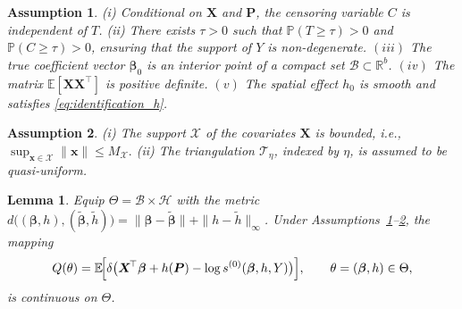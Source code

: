 \documentclass[10pt,a4paper]{amsart}
\newtheorem{assumption}{Assumption}
\newtheorem{lemma}{Lemma}
\begin{document}
\begin{assumption}\label{assumption:identifiability}
	(i) Conditional on $\bm{X}$ and $\bm{P}$, the censoring variable $C$ is independent of $T$.
	(ii) There exists $\tau > 0$ such that $\mathbb{P}(T \ge \tau) > 0$ and $\mathbb{P}(C \ge \tau) > 0$, ensuring that the support of $Y$ is non-degenerate. $(iii)$ The true coefficient vector \(\bm\beta_0\) is an interior point of a compact set \(\mathcal B \subset \mathbb{R}^b\). $(iv)$ The matrix \(\mathbb E[\bm X\bm X^\top]\) is positive definite. $(v)$ The spatial effect $h_0$ is smooth and satisfies \eqref{eq:identification_h}. %
\end{assumption}

\begin{assumption}\label{assumption:density_P}
	(i) The support $\mathcal{X}$ of the covariates $\bm X$ is bounded, i.e.,
	\(
	\sup_{\bm x\in \mathcal{X}} \|\bm x\|\le M_{\mathcal{X}}.
	\) (ii) The triangulation $\mathcal{T}_\eta$, indexed by $\eta$, is assumed to be quasi-uniform.
\end{assumption}

	\begin{lemma}\label{lem:Q_continuous}
		Equip $\Theta=\mathcal B\times\mathcal H$ with the metric
		\(d\bigl((\bm \beta,h),(\tilde{\bm \beta},\tilde h)\bigr)=
		\|\bm \beta-\tilde{\bm\beta}\|+\|h-\tilde h\|_{\infty}\).
		Under Assumptions~\ref{assumption:identifiability}–\ref{assumption:density_P},
		the mapping
		\[
		Q(\theta)=\mathbb E\!\Bigl[
		\delta\bigl(\bm X^{\!\top}\bm \beta
		+h(\bm P)
		-\log s^{(0)}(\bm \beta,h,Y)\bigr)
		\Bigr],
		\qquad \theta=(\bm \beta,h)\in\Theta,
		\]
		is continuous on \(\Theta\).
	\end{lemma}
\end{document}
